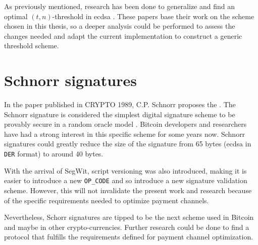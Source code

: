 As previously mentioned, research has been done to generalize and find an
optimal $(t, n)$-threshold in \gls{ecdsa} \cite{10.1007/BFb0052253,
10.1007/978-3-642-27954-6_20}. These papers base their work on the scheme chosen
in this thesis, so a deeper analysis could be performed to assess the
changes needed and adapt the current implementation to construct a generic threshold scheme.

\section{Schnorr signatures}

In the paper 
published in CRYPTO 1989, C.P. Schnorr proposes the  \cite{10.1007/0-387-34805-0_22}. The Schnorr signature is considered
the simplest digital signature scheme to be provably secure in a random oracle
model \cite{Bellare:1993:ROP:168588.168596, 10.1007/978-3-642-29011-4_33}.
Bitcoin developers and researchers have had a strong interest in this specific
scheme for some years now. Schnorr signatures could greatly reduce the size of
the signature from 65 bytes (\gls{ecdsa} in \texttt{DER} format) to around 40 bytes.

With the arrival of SegWit, script versioning was also introduced, making it
is easier to introduce a new \texttt{OP\_CODE} and so introduce a new signature
validation scheme. However, this will not invalidate the present work and
research because of the specific requirements needed to optimize payment channels.

Nevertheless, Schorr signatures are tipped to be the next scheme used in Bitcoin
and maybe in other crypto-currencies. Further research could be done to find a
protocol that fulfills the requirements defined for payment channel
optimization.
